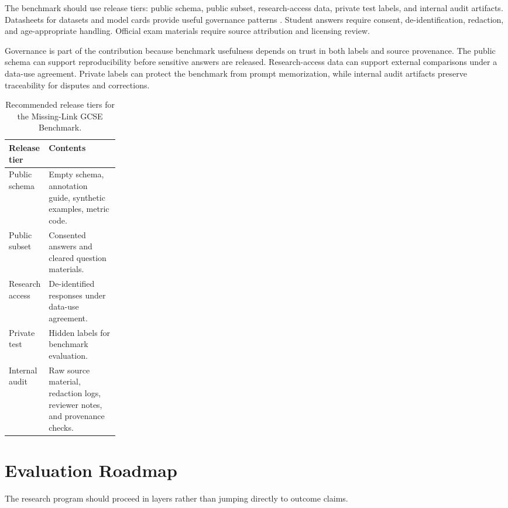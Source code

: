 \documentclass[11pt]{article}
\begin{document}
The benchmark should use release tiers: public schema, public subset, research-access data, private test labels, and internal audit artifacts. Datasheets for datasets and model cards provide useful governance patterns \cite{gebru2021,mitchell2019}. Student answers require consent, de-identification, redaction, and age-appropriate handling. Official exam materials require source attribution and licensing review.

Governance is part of the contribution because benchmark usefulness depends on trust in both labels and source provenance. The public schema can support reproducibility before sensitive answers are released. Research-access data can support external comparisons under a data-use agreement. Private labels can protect the benchmark from prompt memorization, while internal audit artifacts preserve traceability for disputes and corrections.

\begin{table}[H]
\centering
\small
\begin{tabularx}{\linewidth}{L{0.22\linewidth}Y}
\toprule
\textbf{Release tier} & \textbf{Contents}\\
\midrule
Public schema & Empty schema, annotation guide, synthetic examples, metric code.\\
Public subset & Consented answers and cleared question materials.\\
Research access & De-identified responses under data-use agreement.\\
Private test & Hidden labels for benchmark evaluation.\\
Internal audit & Raw source material, redaction logs, reviewer notes, and provenance checks.\\
\bottomrule
\end{tabularx}
\caption{Recommended release tiers for the Missing-Link GCSE Benchmark.}
\label{tab:releasetiers}
\end{table}

\section{Evaluation Roadmap}

The research program should proceed in layers rather than jumping directly to outcome claims.
\end{document}
